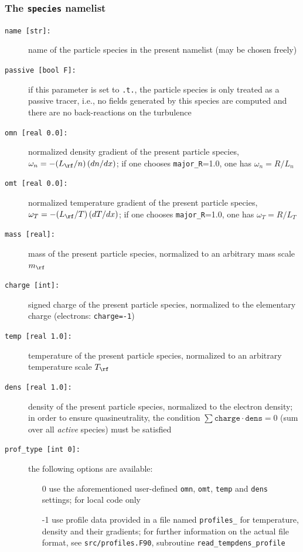 \documentclass[12pt]{article}
\begin{document}
\subsubsection{{The \texttt{species} namelist}}
\hypertarget{species_nml}{}
\begin{description}
\item[\texttt{name [str]:}] name of the particle species in the present namelist (may be chosen freely)
\item[\texttt{passive [bool F]:}] if this parameter is set to \texttt{.t.}, the particle species is
only treated as a passive tracer, i.e., no fields generated by this species are computed and
there are no back-reactions on the turbulence
\item[\texttt{omn [real 0.0]:}] normalized density gradient of the present particle species,
  $\omega_n=-(L_\rf/n)\,(dn/dx)$; if one chooses \texttt{major\_R}=1.0, one has $\omega_n=R/L_n$
\item[\texttt{omt [real 0.0]:}] normalized temperature gradient of the present particle species,
  $\omega_T=-(L_\rf/T)\,(dT/dx)$; if one chooses \texttt{major\_R}=1.0, one has $\omega_T=R/L_T$
\item[\texttt{mass [real]:}] mass of the present particle species, normalized to an arbitrary mass scale $m_\rf$
\item[\texttt{charge [int]:}] signed charge of the present particle species, normalized to the elementary charge
  (electrons: \texttt{charge=-1})
\item[\texttt{temp [real 1.0]:}] temperature of the present particle species, normalized to an arbitrary temperature
scale $T_\rf$
\item[\texttt{dens [real 1.0]:}] density of the present particle species, normalized to the electron density;
in order to ensure quasineutrality, the condition $\sum \texttt{charge}\cdot\texttt{dens}=0$ (sum over all
{\em active} species) must be satisfied
\item[\hypertarget{prof_type}{\tt prof\_type [int 0]:}] the following options are available:
\begin{itemize}
 \item[0] use the aforementioned user-defined \texttt{omn}, \texttt{omt}, \texttt{temp} and \texttt{dens} settings; for local code only
 \item[-1] use profile data provided in a file named \texttt{profiles\_<species name>}
  for temperature, density and their gradients; for further information on the actual file format,
  see \texttt{src/profiles.F90}, subroutine \texttt{read\_tempdens\_profile}

\end{itemize}
\end{description}
\end{document}
